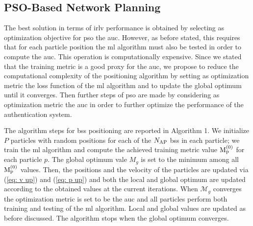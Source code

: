 \documentclass[twocolumns]{IEEEtran}
\begin{document}
\subsection{PSO-Based Network Planning}

The best solution in terms of \ac{irlv} performance is obtained by selecting as optimization objective for \ac{pso} the \ac{auc}. However, as before stated, this requires that for each particle position the \ac{ml} algorithm must also be tested in order to compute the \ac{auc}. This operation is computationally expensive. Since we stated that the training metric is a good proxy for the \ac{auc}, we propose to reduce the computational complexity of the positioning algorithm by setting as optimization metric the loss function of the \ac{ml} algorithm and to update the global optimum until it converges. Then further steps of \ac{pso} are made by considering as optimization metric the \ac{auc} in order to further optimize the performance of the authentication system.

The algorithm steps for \acp{bs} positioning are reported in Algorithm 1. We initialize $P$ particles with random positions for each of the $N_{\rm AP}$ \acp{bs} in each particle; we train the \ac{ml} algorithm and compute the achieved training metric value $\rm{M}_p^{(0)}$ for each particle $p$. The global optimum vale $M_g$ is set to the minimum among all $\rm{M}_p^{(0)}$ values. Then, the positions and the velocity of the particles are updated via (\ref{eq: v up}) and (\ref{eq: p up}) and both the local and global optimum are updated according to the obtained values at the current iterations. When $\mathcal{M}_g$ converges the optimization metric is set to be the \ac{auc} and all particles perform both training and testing of the \ac{ml} algorithm. Local and global values are updated as before discussed. The algorithm stops when the global optimum converges.
\end{document}
